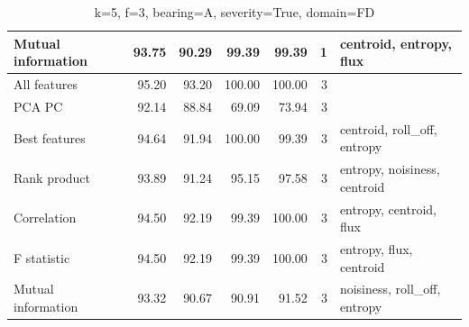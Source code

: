 \begin{table}[h]
\begin{adjustbox}{width=\textwidth}
\begin{tabular}{|l|rr|rr|r|l|}
Mutual information                    & \multicolumn{1}{r|}{93.75}          & 90.29                              & \multicolumn{1}{r|}{99.39}          & 99.39                              & 1                                                   & centroid, entropy, flux                 \\ \hline
All features                          & \multicolumn{1}{r|}{95.20}          & 93.20                              & \multicolumn{1}{r|}{100.00}         & 100.00                             & 3                                                   &                                         \\ \hline
PCA PC                                & \multicolumn{1}{r|}{92.14}          & 88.84                              & \multicolumn{1}{r|}{69.09}          & 73.94                              & 3                                                   &                                         \\ \hline
Best features                         & \multicolumn{1}{r|}{94.64}          & 91.94                              & \multicolumn{1}{r|}{100.00}         & 99.39                              & 3                                                   & centroid, roll\_off, entropy            \\ \hline
Rank product                          & \multicolumn{1}{r|}{93.89}          & 91.24                              & \multicolumn{1}{r|}{95.15}          & 97.58                              & 3                                                   & entropy, noisiness, centroid            \\ \hline
Correlation                           & \multicolumn{1}{r|}{94.50}          & 92.19                              & \multicolumn{1}{r|}{99.39}          & 100.00                             & 3                                                   & entropy, centroid, flux                 \\ \hline
F statistic                           & \multicolumn{1}{r|}{94.50}          & 92.19                              & \multicolumn{1}{r|}{99.39}          & 100.00                             & 3                                                   & entropy, flux, centroid                 \\ \hline
Mutual information                    & \multicolumn{1}{r|}{93.32}          & 90.67                              & \multicolumn{1}{r|}{90.91}          & 91.52                              & 3                                                   & noisiness, roll\_off, entropy           \\ \hline
\end{tabular}
\end{adjustbox}
\caption{k=5, f=3, bearing=A, severity=True, domain=FD}
\end{table}






